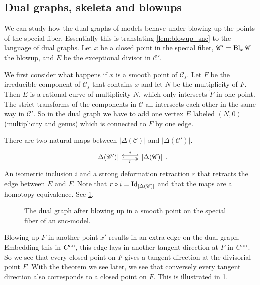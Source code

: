 \subsection{Dual graphs, skeleta and blowups} \label{sec:dual_graphs_and_blowups}
We can study how the dual graphs of models behave under blowing up the points of the special fiber.
Essentially this is translating \cref{lem:blowup_snc} to the language of dual graphs.
Let $x$ be a closed point in the special fiber, $\mathscr C' = \operatorname{Bl}_{x} \mathscr C$ the blowup, and $E$ be the exceptional divisor in $\mathscr C'$.

We first consider what happens if $x $ is a smooth point of $\mathscr C_s$. 
Let $F$ be the irreducible component of $\mathscr C_s$ that contains $x$ and let $N$ be the multiplicity of $F$. 
Then $E$ is a rational curve of multiplicity $N$, which only intersects $\tilde F$ in one point. 
The strict transforms of the components in $\mathscr C$ all intersects each other in the same way in $\mathscr C'$. 
So in the dual graph we have to add one vertex $E$ labeled $(N, 0)$ (multiplicity and genus) which is connected to $F$ by one edge.

There are two natural maps between $|\Delta(\mathscr C)|$ and $|\Delta(\mathscr C')|$. 
\[
\begin{tikzcd}
	{|\Delta(\mathscr C')|} \rar[hookleftarrow, shift left]{i} \rar[twoheadrightarrow, shift right, ']{r} & {|\Delta(\mathscr C)|} 
\end{tikzcd}
.\] 
An isometric inclusion $i$ and a strong deformation retraction $r$ that retracts the edge between  $E$ and $F$. 
Note that $r \circ i = \operatorname{Id}_{|\Delta(\mathscr C)|}$ and that the maps are a homotopy equivalence. 
See \cref{fig:blowup_smooth_point_skeleton}. 

\begin{figure}[ht]
    \centering
    \caption{The dual graph after blowing up in a smooth point on the special fiber of an snc-model. }
    \label{fig:blowup_smooth_point_skeleton}
\end{figure}

\begin{remark}
	Blowing up $ F$ in another point $x'$ results in an extra edge on the dual graph. 
	Embedding this in $C{}^{\text{an}}$, this edge lays in another tangent direction at $F$ in $C{}^{\text{an}}$. 
	So we see that every closed point  on  $F$ gives a tangent direction at the divisorial point $F$. 
	With the theorem we see later, we see that conversely every tangent direction also corresponds to a closed point on $F$. 
	This is illustrated in \cref{fig:blowup_smooth_point_skeleton}.
\end{remark}


